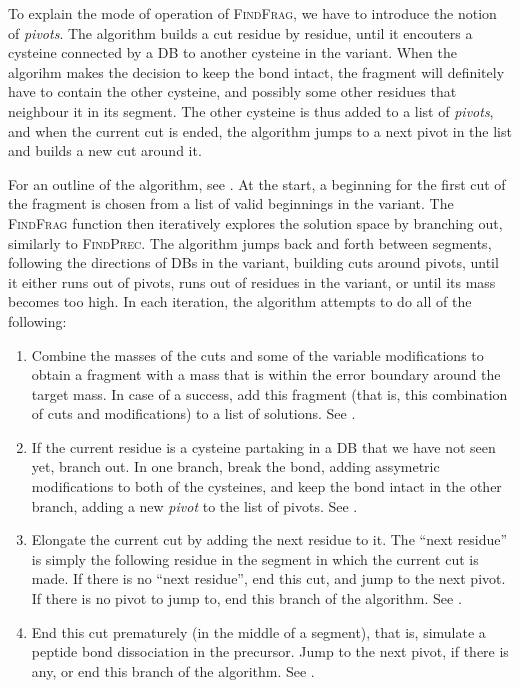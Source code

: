 To explain the mode of operation of \textsc{FindFrag}, we have to introduce the notion of \emph{pivots}. The algorithm builds a cut residue by residue, until it encouters a cysteine connected by a DB to another cysteine in the variant. When the algorihm makes the decision to keep the bond intact, the fragment will definitely have to contain the other cysteine, and possibly some other residues that neighbour it in its segment. The other cysteine is thus added to a list of \emph{pivots}, and when the current cut is ended, the algorithm jumps to a next pivot in the list and builds a new cut around it.

For an outline of the algorithm, see . At the start, a beginning for the first cut of the fragment is chosen from a list of valid beginnings in the variant. The \textsc{FindFrag} function then iteratively explores the solution space by branching out, similarly to \textsc{FindPrec}. The algorithm jumps back and forth between segments, following the directions of DBs in the variant, building cuts around pivots, until it either runs out of pivots, runs out of residues in the variant, or until its mass becomes too high. In each iteration, the algorithm attempts to do all of the following:

\begin{enumerate}
  \item Combine the masses of the  cuts and some of the variable modifications to obtain a fragment with a mass that is within the error boundary around the target mass. In case of a success, add this fragment (that is, this combination of cuts and modifications) to a list of solutions. See .
  \item If the current residue is a cysteine partaking in a DB that we have not seen yet, branch out. In one branch, break the bond, adding assymetric modifications to both of the cysteines, and keep the bond intact in the other branch, adding a new \emph{pivot} to the list of pivots. See .
  \item Elongate the current cut by adding the next residue to it. The ``next residue'' is simply the following residue in the segment in which the current cut is made. If there is no ``next residue'', end this cut, and jump to the next pivot. If there is no pivot to jump to, end this branch of the algorithm. See .
  \item End this cut prematurely (in the middle of a segment), that is, simulate a peptide bond dissociation in the precursor. Jump to the next pivot, if there is any, or end this branch of the algorithm. See .
\end{enumerate}

